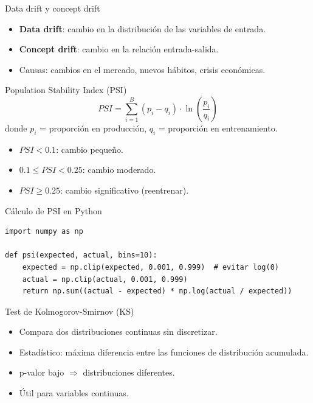 \documentclass[aspectratio=169, 10pt, xcolor=table]{beamer}
\begin{document}
\begin{frame}{Data drift y concept drift}
    \begin{itemize}
        \item \textbf{Data drift}: cambio en la distribución de las variables de entrada.
        \item \textbf{Concept drift}: cambio en la relación entrada-salida.
        \item Causas: cambios en el mercado, nuevos hábitos, crisis económicas.
    \end{itemize}
\end{frame}

\begin{frame}{Population Stability Index (PSI)}
    \[
    PSI = \sum_{i=1}^{B} (p_i - q_i) \cdot \ln\left(\frac{p_i}{q_i}\right)
    \]
    donde $p_i$ = proporción en producción, $q_i$ = proporción en entrenamiento.
    \begin{itemize}
        \item $PSI < 0.1$: cambio pequeño.
        \item $0.1 \le PSI < 0.25$: cambio moderado.
        \item $PSI \ge 0.25$: cambio significativo (reentrenar).
    \end{itemize}
\end{frame}

\begin{frame}[fragile]{Cálculo de PSI en Python}
    \begin{lstlisting}
import numpy as np

def psi(expected, actual, bins=10):
    expected = np.clip(expected, 0.001, 0.999)  # evitar log(0)
    actual = np.clip(actual, 0.001, 0.999)
    return np.sum((actual - expected) * np.log(actual / expected))
    \end{lstlisting}
\end{frame}

\begin{frame}{Test de Kolmogorov-Smirnov (KS)}
    \begin{itemize}
        \item Compara dos distribuciones continuas sin discretizar.
        \item Estadístico: máxima diferencia entre las funciones de distribución acumulada.
        \item p-valor bajo $\Rightarrow$ distribuciones diferentes.
        \item Útil para variables continuas.
    \end{itemize}
\end{frame}
\end{document}
